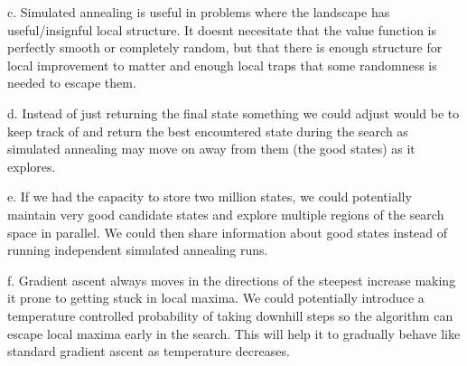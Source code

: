 \documentclass{article}
\begin{document}
c. Simulated annealing is useful in problems where the landscape has useful/insignful local structure. It doesnt necesitate that the value function is perfectly smooth or completely random, but that there is enough structure for local improvement to matter and enough local traps that some randomness is needed to escape them.

d. Instead of just returning the final state something we could adjust would be to keep track of and return the best encountered state during the search as simulated annealing may move on away from them (the good states) as it explores.

e. If we had the capacity to store two million states, we could potentially maintain very good candidate states and explore multiple regions of the search space in parallel. We could then share information about good states instead of running independent simulated annealing runs.

f. Gradient ascent always moves in the directions of the steepest increase making it prone to getting stuck in local maxima. We could potentially introduce a temperature controlled probability of taking downhill steps so the algorithm can escape local maxima early in the search. This will help it to gradually behave like standard gradient ascent as temperature decreases.
\end{document}
